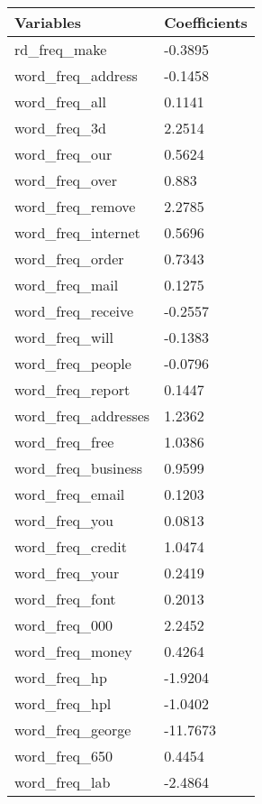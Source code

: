 \begin{tabular}{|l|l|}
\hline
Variables                    & Coefficients \\
\hline
rd\_freq\_make                & -0.3895 \\
word\_freq\_address           &   -0.1458 \\
word\_freq\_all               &    0.1141 \\
word\_freq\_3d                &    2.2514 \\
word\_freq\_our               &    0.5624 \\
word\_freq\_over              &     0.883 \\
word\_freq\_remove            &    2.2785 \\
word\_freq\_internet          &    0.5696 \\
word\_freq\_order             &    0.7343 \\
word\_freq\_mail              &    0.1275 \\
word\_freq\_receive           &   -0.2557 \\
word\_freq\_will              &   -0.1383 \\
word\_freq\_people            &   -0.0796 \\
word\_freq\_report            &    0.1447 \\
word\_freq\_addresses         &    1.2362 \\
word\_freq\_free              &    1.0386 \\
word\_freq\_business          &    0.9599 \\
word\_freq\_email             &    0.1203 \\
word\_freq\_you               &    0.0813 \\
word\_freq\_credit            &    1.0474 \\
word\_freq\_your              &    0.2419 \\
word\_freq\_font              &    0.2013 \\
word\_freq\_000               &    2.2452 \\
word\_freq\_money             &    0.4264 \\
word\_freq\_hp                &   -1.9204 \\
word\_freq\_hpl               &   -1.0402 \\
word\_freq\_george            &  -11.7673 \\
word\_freq\_650               &    0.4454 \\
word\_freq\_lab               &   -2.4864 \\

\end{tabular}
